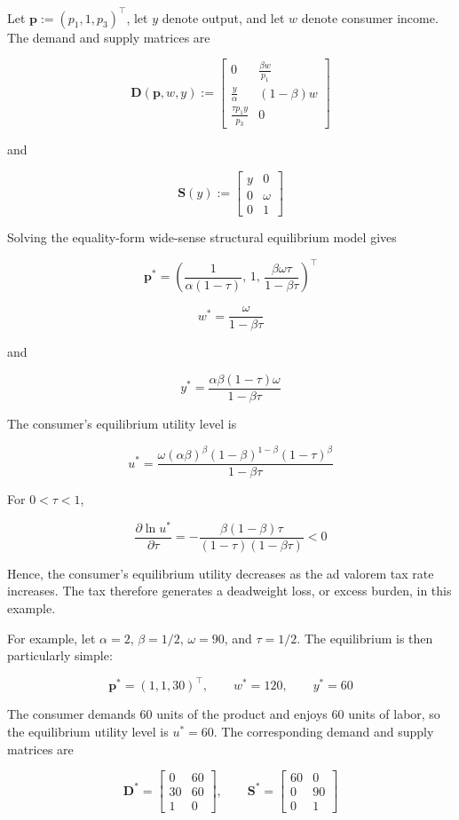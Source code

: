 \documentclass[
  letterpaper,
  DIV=11,
  numbers=noendperiod]{scrreprt}
\begin{document}
Let \(\mathbf p:=(p_1,1,p_3)^\top\), let \(y\) denote output, and let
\(w\) denote consumer income. The demand and supply matrices are

\[
\mathbf D(\mathbf p,w,y):=
\begin{bmatrix}
0 & \frac{\beta w}{p_1}\\
\frac{y}{\alpha} & (1-\beta)w\\
\frac{\tau p_1y}{p_3} & 0
\end{bmatrix}
\]

and

\[
\mathbf S(y):=
\begin{bmatrix}
y & 0\\
0 & \omega\\
0 & 1
\end{bmatrix}
\]

Solving the equality-form wide-sense structural equilibrium model gives

\[
\mathbf p^*
=
\left(
\frac{1}{\alpha(1-\tau)},
\,1,\,
\frac{\beta\omega\tau}{1-\beta\tau}
\right)^\top
\]

\[
w^*
=
\frac{\omega}{1-\beta\tau}
\]

and

\[
y^*
=
\frac{\alpha\beta(1-\tau)\omega}{1-\beta\tau}
\]

The consumer's equilibrium utility level is

\[
u^*
=
\frac{
\omega(\alpha\beta)^\beta(1-\beta)^{1-\beta}(1-\tau)^\beta
}{
1-\beta\tau
}
\]

For \(0<\tau<1\),

\[
\frac{\partial\ln u^*}{\partial\tau}
=
-\frac{\beta(1-\beta)\tau}
{(1-\tau)(1-\beta\tau)}
<0
\]

Hence, the consumer's equilibrium utility decreases as the ad valorem
tax rate increases. The tax therefore generates a deadweight loss, or
excess burden, in this example.

For example, let \(\alpha=2\), \(\beta=1/2\), \(\omega=90\), and
\(\tau=1/2\). The equilibrium is then particularly simple:

\[
\mathbf p^*=(1,1,30)^\top,\qquad
w^*=120,\qquad
y^*=60
\]

The consumer demands 60 units of the product and enjoys 60 units of
labor, so the equilibrium utility level is \(u^*=60\). The corresponding
demand and supply matrices are

\[
\mathbf D^*
=
\begin{bmatrix}
0&60\\
30&60\\
1&0
\end{bmatrix},
\qquad
\mathbf S^*
=
\begin{bmatrix}
60&0\\
0&90\\
0&1
\end{bmatrix}
\]
\end{document}
